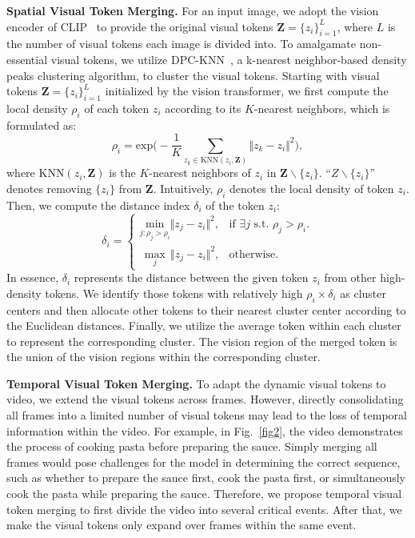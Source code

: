\documentclass[10pt,twocolumn,letterpaper]{article}
\newcommand{\myparagraph}[1]{\textbf{#1}\hspace{1.8ex}}
\begin{document}
\noindent \myparagraph{Spatial Visual Token Merging.} 
For an input image, we adopt the vision encoder of CLIP~\cite{radford2021learning} to provide the original visual tokens $\bm{Z}=\{z_i\}_{i=1}^{L}$, where $L$ is the number of visual tokens each image is divided into. To amalgamate non-essential visual tokens, we utilize DPC-KNN~\cite{du2016study}, a k-nearest neighbor-based density peaks clustering algorithm, to cluster the visual tokens. Starting with visual tokens $\bm{Z}=\{z_i\}_{i=1}^{L}$ initialized by the vision transformer, we first compute the local density $\rho_i$ of each token $z_{i}$ according to its $K$-nearest neighbors, which is formulated as:
\begin{equation}
\rho_i=\textrm{exp}\big(-\frac{1}{K}\sum_{z_{k}\in \textrm{KNN}(z_{i}, \bm{Z})}\Vert z_{k}-z_{i} \Vert^2\big),
\label{eq:1}
\end{equation}
where $\textrm{KNN}(z_{i}, \bm{Z})$ is the $K$-nearest neighbors of $z_{i}$ in $\bm{Z} \backslash \{z_{i}\}$. ``$Z \backslash \{z_{i}\}$'' denotes removing $\{z_{i}\}$ from $\bm{Z}$. Intuitively, $\rho_i$ denotes the local density of token $z_{i}$. Then, we compute the distance index $\delta_i$ of the token $z_{i}$:
\begin{equation}
\delta_i=
\begin{cases}
\underset{j:\rho_j>\rho_i}{\textrm{min}} \Vert z_{j}-z_{i} \Vert^2, & \text{if\ $\exists j$\ s.t.\ $\rho_j>\rho_i$.}\\
\ \ \underset{j}{\textrm{max}} \ \ \Vert z_{j}-z_{i} \Vert^2, & \text{otherwise.}
\end{cases}
\label{eq:2}
\end{equation}
In essence, $\delta_i$ represents the distance between the given token $z_{i}$ from other high-density tokens. We identify those tokens with relatively high $\rho_i \times \delta_i$ as cluster centers and then allocate other tokens to their nearest cluster center according to the Euclidean distances. Finally, we utilize the average token within each cluster to represent the corresponding cluster. The vision region of the merged token is the union of the vision regions within the corresponding cluster.

\noindent \myparagraph{Temporal Visual Token Merging.} 
To adapt the dynamic visual tokens to video, we extend the visual tokens across frames. However, directly consolidating all frames into a limited number of visual tokens may lead to the loss of temporal information within the video. For example, in Fig.~\ref{fig2}, the video demonstrates the process of cooking pasta before preparing the sauce. Simply merging all frames would pose challenges for the model in determining the correct sequence, such as whether to prepare the sauce first, cook the pasta first, or simultaneously cook the pasta while preparing the sauce. Therefore, we propose temporal visual token merging to first divide the video into several critical events. After that, we make the visual tokens only expand over frames within the same event.
\end{document}
